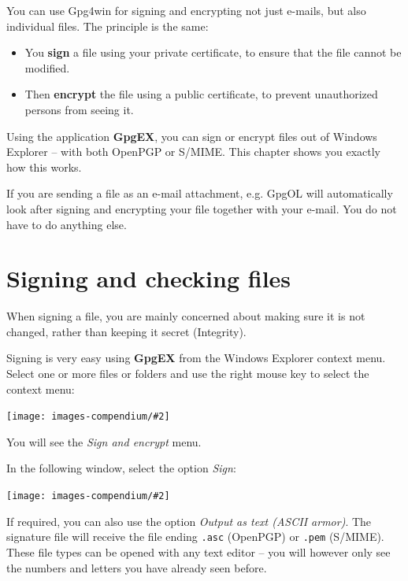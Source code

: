 \documentclass[a4paper,11pt,oneside,openright,titlepage]{scrbook}
\newcommand{\Menu}[1]{\textit{#1}}
\newcommand{\Filename}[1]{\small{\texttt{#1}}\normalsize}
\newcommand{\Email}{e-mail}
\newcommand{\IncludeImage}[2][]{
\begin{center}
  \texttt{[image: images-compendium/\#2]}%
\end{center}
}
\begin{document}
You can use Gpg4win for signing and encrypting not just \Email{}s, but
also individual files. The principle is the same:

\begin{itemize}
  \item You \textbf{sign} a file using your private certificate, to
      ensure that the file cannot be modified.

  \item Then \textbf{encrypt} the file using a public certificate, to
      prevent unauthorized persons from seeing it.
\end{itemize}

Using the application \textbf{GpgEX}, you can sign or encrypt files
out of Windows Explorer -- with both OpenPGP or S/MIME.  This chapter
shows you exactly how this works.

If you are sending a file as an \Email{} attachment, e.g. GpgOL will
automatically look after signing and encrypting your file together
with your \Email{}.  You do not have to do anything else.

\clearpage
\section{Signing and checking files}
\label{sec_signFile}

When signing a file, you are mainly concerned about making sure it is
not changed, rather than keeping it secret (Integrity).

Signing is very easy using \textbf{GpgEX} from the Windows Explorer
context menu.  Select one or more files or folders and use the right
mouse key to select the context menu:

\IncludeImage[width=0.3\textwidth]{sc-gpgex-contextmenu-signEncrypt_en}

You will see the \Menu{Sign and encrypt} menu.

\clearpage
In the following window, select the option \Menu{Sign}:

\IncludeImage[width=0.85\textwidth]{sc-kleopatra-signFile1_en}

If required, you can also use the option  \Menu{Output as text (ASCII
armor)}.  The signature file will receive the file
ending \Filename{.asc} (OpenPGP) or  \Filename{.pem} (S/MIME).  These
file types can be opened with any text editor -- you will however only
see the numbers and letters you have already seen before.
\end{document}
